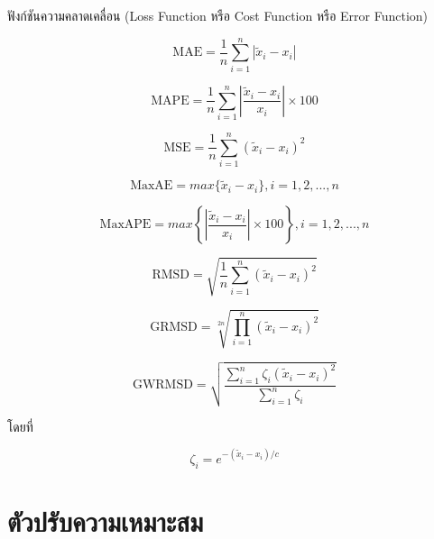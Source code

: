 ฟังก์ชันความคลาดเคลื่อน (Loss Function หรือ Cost Function หรือ Error Function)

\begin{equation}
    \text{MAE} = \frac{1}{n} \sum_{i=1}^{n} | \tilde{x}_{i} - x_{i} |
\end{equation}

\begin{equation}
    \text{MAPE} = \frac{1}{n} \sum_{i=1}^{n} \left| \frac{\tilde{x}_{i} - x_{i}}{x_{i}} \right| \times 100
\end{equation}

\begin{equation}
    \text{MSE} = \frac{1}{n} \sum_{i=1}^{n} \left( \tilde{x}_{i} - x_{i} \right)^2
\end{equation}

\begin{equation}
    \text{MaxAE} = max\{\tilde{x}_{i} - x_{i}\}, i = 1, 2, ..., n
\end{equation}

\begin{equation}
    \text{MaxAPE} = max\left\{\left| \frac{\tilde{x}_{i} - x_{i}}{x_{i}} \right| \times 100 \right\}, i = 1, 2, ..., n
\end{equation}

\begin{equation}
    \text{RMSD} = \sqrt{ \frac{1}{n} \sum_{i=1}^{n} (\tilde{x}_{i} - x_{i})^{2} }
    \label{eq:rmsd}
\end{equation}

\begin{equation}
    \text{GRMSD} = \sqrt[2n]{ \prod_{i=1}^{n} (\tilde{x}_{i} - x_{i})^{2} }
    \label{eq:grmsd}
\end{equation}

\begin{equation}
    \text{GWRMSD} = \sqrt{ \frac{\sum_{i=1}^{n} \zeta_{i} (\tilde{x}_{i} - x_{i})^{2}}{\sum_{i=1}^{n} \zeta_{i} } }
    \label{eq:gwrmsd}
\end{equation}

\indent โดยที่

\begin{equation}
    \zeta_{i} = e^{-(\tilde{x}_{i} - x_{i}) / c}
\end{equation}

\section{ตัวปรับความเหมาะสม}
\label{sec:optimizer}

